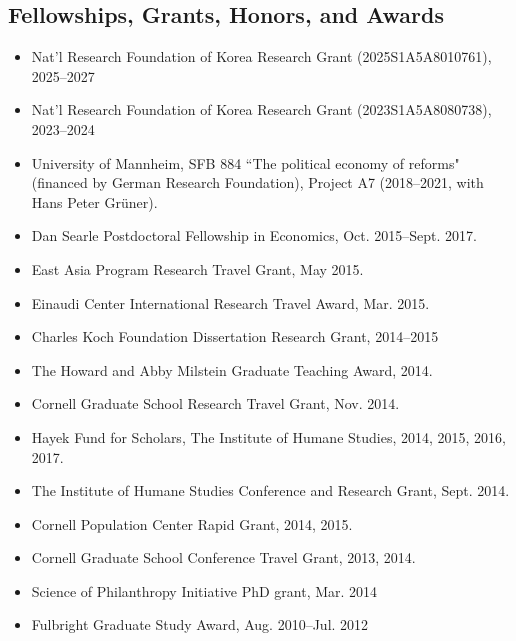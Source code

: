 \documentclass[margin, a4paper]{res}
\begin{document}
\begin{resume}
\section{Fellowships, Grants, Honors, and Awards}
\begin{itemize}[leftmargin=*]
\item Nat'l Research Foundation of Korea Research Grant (2025S1A5A8010761), 2025--2027
\item Nat'l Research Foundation of Korea Research Grant (2023S1A5A8080738), 2023--2024
\item University of Mannheim, SFB 884 ``The political economy of reforms" (financed by German Research Foundation), Project A7 (2018--2021, with Hans Peter Gr{\"u}ner).
\item Dan Searle Postdoctoral Fellowship in Economics, Oct. 2015--Sept. 2017.
\item East Asia Program Research Travel Grant, May 2015.
\item Einaudi Center International Research Travel Award, Mar. 2015.
\item Charles Koch Foundation Dissertation Research Grant, 2014--2015
\item The Howard and Abby Milstein Graduate Teaching Award, 2014.
\item Cornell Graduate School Research Travel Grant, Nov. 2014.
\item Hayek Fund for Scholars, The Institute of Humane Studies, 2014, 2015, 2016, 2017.
\item The Institute of Humane Studies Conference and Research Grant, Sept. 2014.
\item Cornell Population Center Rapid Grant, 2014, 2015.
\item Cornell Graduate School Conference Travel Grant, 2013, 2014.
\item Science of Philanthropy Initiative PhD grant, Mar. 2014
\item Fulbright Graduate Study Award, Aug. 2010--Jul. 2012
\end{itemize}


\end{resume}
\end{document}
